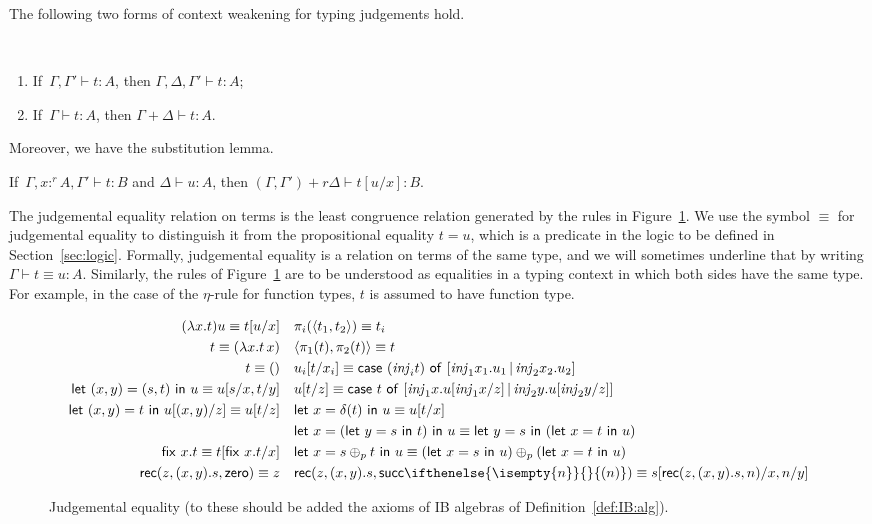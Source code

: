 \documentclass[a4paper,UKenglish,cleveref, autoref, thm-restate]{lipics-v2021}
\providecommand*{\ifempty}[3]{\ifthenelse{\isempty{#1}}{#2}{#3}}
\newcommand{\parensmathoper}[2]{\ensuremath{#1\ifempty{#2}{}{(#2)}}}
\newcommand{\inj}{\mathsf{\mathit{inj}}}
\newcommand{\scaling}{}
\newcommand{\ts}{\vdash}
\newcommand{\hastype}[3]{#1\ts #2 : #3}
\newcommand{\letIn}[2]{\mathsf{let~} #1 \mathsf{~in~} #2}
\newcommand{\fix}[2]{\mathsf{fix~} #1 . #2 }
\newcommand{\Zero}{\mathsf{zero}}
\newcommand{\Succ}{\parensmathoper{\mathsf{succ}}}
\newcommand{\Rec}[3]{\mathsf{rec}(#1,#2,#3)}
\newcommand{\tuple}[1]{\langle #1 \rangle}
\newcommand{\case}[5]{\mathsf{case~} #1%
    \mathsf{~of~} [\inj_1 #2 . #3 \,|\, \inj_2 #4 . #5]%
}
\newcommand{\peq}{=}
\newcommand{\jeq}{\equiv}
\begin{document}
The following two forms of context weakening for typing judgements hold.
\begin{lemma}[Weakening] \label{lm:weakening} \ 
\begin{enumerate}
    \item If\, $\hastype{\Gamma,\Gamma'}{t}{A}$, then $\hastype{\Gamma,\Delta,\Gamma'}{t}{A}$;
    \item If\, $\hastype{\Gamma}{t}{A}$, then $\hastype{\Gamma+\Delta}{t}{A}$.
\end{enumerate}
\end{lemma}

Moreover, we have the substitution lemma.
\begin{lemma}[Substitution] \label{lm:substitution}
If\, $\hastype{\Gamma, x{:^r}A, \Gamma'}{t}{B}$ and $\hastype{\Delta}{u}{A}$, 
then $\hastype{(\Gamma,\Gamma') + r \scaling \Delta}{t[u/x]}{B}$.
\end{lemma}

The judgemental equality relation on terms is the least congruence relation generated by the rules in Figure~\ref{eq:judgmental:eq}. We use the symbol $\jeq$ for judgemental equality
to distinguish it from the propositional equality $t \peq u$, which is a predicate in the logic to be defined in Section~\ref{sec:logic}. 
Formally, judgemental equality is a relation on terms of the same type, and we will sometimes underline that by writing $\hastype\Gamma{t\jeq u}{A}$.
Similarly, the rules of Figure~\ref{eq:judgmental:eq} are to be understood as equalities in a typing context in which both sides have the same type. For example, in the case of the $\eta$-rule
for function types, $t$ is assumed to have function type.

\begin{figure}[tbp]
\small
\begin{align*}
 (\lambda x. t)u \jeq t[u/x] &&& \pi_i(\tuple{t_1, t_2}) \jeq t_i \\
 t \jeq (\lambda x. t\,x) &&&
 \tuple{\pi_1(t), \pi_2(t)} \jeq t \\
t \jeq () &&&
 u_i[t/x_i] \jeq \case{(\inj_i t)}{x_1}{u_1}{x_2}{u_2} \\
 \letIn{(x,y) = (s,t)}u \jeq u[s/x,t/y] &&& 
  u[t/z] \jeq \case{t}{x}{u[\inj_1 x/z]}{y}{u[\inj_2 y/z]} \\
  \letIn{(x,y) = t}{u[(x,y)/z]} \jeq u[t/z]  &&&
  \letIn{x = \delta(t)}{u} \jeq u[t/x] \\ 
 &&& \letIn{x = (\letIn{y=s}t)}{u} \jeq \letIn{y=s}{(\letIn{x=t}u)}
   \\
 \fix xt \jeq t[\fix xt/x] &&& 
 \letIn{x = s\oplus_p t}u \jeq (\letIn{x = s}u)\oplus_p(\letIn{x=t}u) \\
 \Rec{z}{(x,y).s}{\Zero} \jeq z &&&
 \Rec z{(x,y).s}{\Succ n} \jeq s[\Rec z{(x,y).s}n/x, n/y]
\end{align*}
\caption{Judgemental equality (to these should be added the axioms of IB algebras of Definition~\ref{def:IB:alg}).}
\label{eq:judgmental:eq}
\end{figure}
\end{document}
